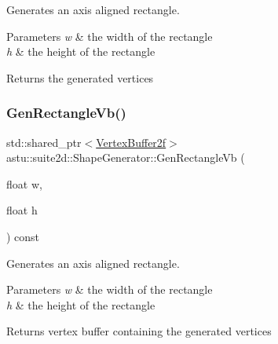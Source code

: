 Generates an axis aligned rectangle.


\begin{DoxyParams}{Parameters}
{\em w} & the width of the rectangle \\
\hline
{\em h} & the height of the rectangle \\
\hline
\end{DoxyParams}
\begin{DoxyReturn}{Returns}
the generated vertices 
\end{DoxyReturn}
\mbox{\label{classastu_1_1suite2d_1_1ShapeGenerator_a4430884bf8387a304ef97a5ab3f3b217}} 
\subsubsection{\texorpdfstring{Gen\+Rectangle\+Vb()}{GenRectangleVb()}}
{\footnotesize\ttfamily std\+::shared\+\_\+ptr$<$\hyperlink{group__gfx__group_ga081cf45a441eef100dfbb1e0f64c3826}{Vertex\+Buffer2f}$>$ astu\+::suite2d\+::\+Shape\+Generator\+::\+Gen\+Rectangle\+Vb (\begin{DoxyParamCaption}\item[{float}]{w,  }\item[{float}]{h }\end{DoxyParamCaption}) const\hspace{0.3cm}{\ttfamily [inline]}}

Generates an axis aligned rectangle.


\begin{DoxyParams}{Parameters}
{\em w} & the width of the rectangle \\
\hline
{\em h} & the height of the rectangle \\
\hline
\end{DoxyParams}
\begin{DoxyReturn}{Returns}
vertex buffer containing the generated vertices 
\end{DoxyReturn}
\mbox{\label{classastu_1_1suite2d_1_1ShapeGenerator_ae75b45a6f4d2d1512bfc43138f485870}} 
